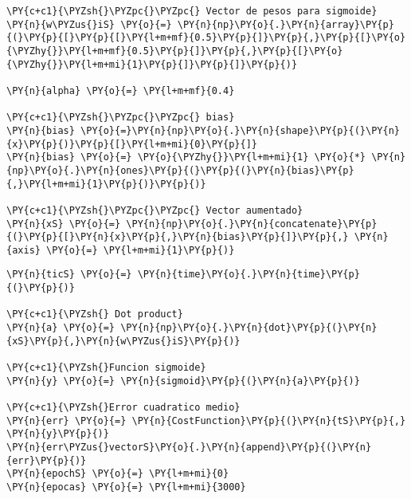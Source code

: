 \begin{tcolorbox}[breakable, size=fbox, boxrule=1pt, pad at break*=1mm,colback=cellbackground, colframe=cellborder]
\begin{Verbatim}[commandchars=\\\{\}]
\PY{c+c1}{\PYZsh{}\PYZpc{}\PYZpc{} Vector de pesos para sigmoide}
\PY{n}{w\PYZus{}iS} \PY{o}{=} \PY{n}{np}\PY{o}{.}\PY{n}{array}\PY{p}{(}\PY{p}{[}\PY{p}{[}\PY{l+m+mf}{0.5}\PY{p}{]}\PY{p}{,}\PY{p}{[}\PY{o}{\PYZhy{}}\PY{l+m+mf}{0.5}\PY{p}{]}\PY{p}{,}\PY{p}{[}\PY{o}{\PYZhy{}}\PY{l+m+mi}{1}\PY{p}{]}\PY{p}{]}\PY{p}{)}

\PY{n}{alpha} \PY{o}{=} \PY{l+m+mf}{0.4}

\PY{c+c1}{\PYZsh{}\PYZpc{}\PYZpc{} bias}
\PY{n}{bias} \PY{o}{=}\PY{n}{np}\PY{o}{.}\PY{n}{shape}\PY{p}{(}\PY{n}{x}\PY{p}{)}\PY{p}{[}\PY{l+m+mi}{0}\PY{p}{]}
\PY{n}{bias} \PY{o}{=} \PY{o}{\PYZhy{}}\PY{l+m+mi}{1} \PY{o}{*} \PY{n}{np}\PY{o}{.}\PY{n}{ones}\PY{p}{(}\PY{p}{(}\PY{n}{bias}\PY{p}{,}\PY{l+m+mi}{1}\PY{p}{)}\PY{p}{)}

\PY{c+c1}{\PYZsh{}\PYZpc{}\PYZpc{} Vector aumentado}
\PY{n}{xS} \PY{o}{=} \PY{n}{np}\PY{o}{.}\PY{n}{concatenate}\PY{p}{(}\PY{p}{[}\PY{n}{x}\PY{p}{,}\PY{n}{bias}\PY{p}{]}\PY{p}{,} \PY{n}{axis} \PY{o}{=} \PY{l+m+mi}{1}\PY{p}{)}
\end{Verbatim}
\end{tcolorbox}

    \begin{tcolorbox}[breakable, size=fbox, boxrule=1pt, pad at break*=1mm,colback=cellbackground, colframe=cellborder]
\begin{Verbatim}[commandchars=\\\{\}]
\PY{n}{ticS} \PY{o}{=} \PY{n}{time}\PY{o}{.}\PY{n}{time}\PY{p}{(}\PY{p}{)}

\PY{c+c1}{\PYZsh{} Dot product}
\PY{n}{a} \PY{o}{=} \PY{n}{np}\PY{o}{.}\PY{n}{dot}\PY{p}{(}\PY{n}{xS}\PY{p}{,}\PY{n}{w\PYZus{}iS}\PY{p}{)}

\PY{c+c1}{\PYZsh{}Funcion sigmoide}
\PY{n}{y} \PY{o}{=} \PY{n}{sigmoid}\PY{p}{(}\PY{n}{a}\PY{p}{)}

\PY{c+c1}{\PYZsh{}Error cuadratico medio}
\PY{n}{err} \PY{o}{=} \PY{n}{CostFunction}\PY{p}{(}\PY{n}{tS}\PY{p}{,} \PY{n}{y}\PY{p}{)}
\PY{n}{err\PYZus{}vectorS}\PY{o}{.}\PY{n}{append}\PY{p}{(}\PY{n}{err}\PY{p}{)}
\PY{n}{epochS} \PY{o}{=} \PY{l+m+mi}{0}
\PY{n}{epocas} \PY{o}{=} \PY{l+m+mi}{3000}
\end{Verbatim}
\end{tcolorbox}

